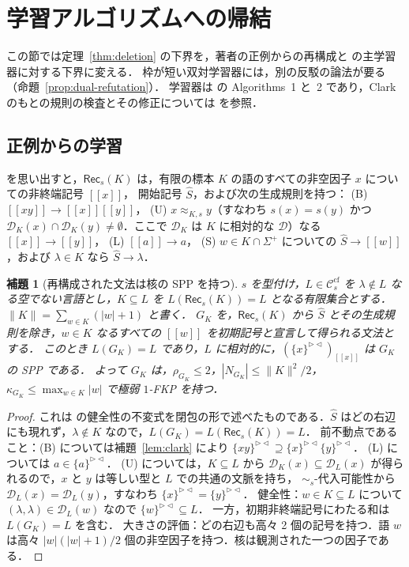 \documentclass[11pt,a4paper]{ltjsarticle}
\numberwithin{equation}{section}
\theoremstyle{plain}
\newtheorem{lemma}[theorem]{補題}
\theoremstyle{definition}
\theoremstyle{remark}
\theoremstyle{plain}
\newcommand{\eps}{\lambda}
\newcommand{\RL}{^{\rhd\lhd}}
\newcommand{\D}{\mathcal D}
\newcommand{\Ccf}[1]{\mathcal C^{\mathrm{cf}}_{#1}}
\begin{document}
\section{学習アルゴリズムへの帰結}\label{sec:applications}

この節では定理~\ref{thm:deletion} の下界を，著者の正例からの再構成と \citet{ky2017} の主学習器に対する下界に変える．
枠が短い双対学習器には，別の反駁の論法が要る（命題~\ref{prop:dual-refutation}）．
学習器は \citet{ky2017} の Algorithms~1 と~2 であり，Clark のもとの規則の検査とその修正については \citet{leiss2014} を参照．

\subsection*{正例からの学習}

\citet[Sec.~4.1]{kuriyama-tcs1} を思い出すと，$\mathsf{Rec}_s(K)$ は，有限の標本 $K$ の語のすべての非空因子 $x$ についての非終端記号 $[\![x]\!]$，
開始記号 $\widehat S$，および次の生成規則を持つ：
(B) $[\![xy]\!]\to[\![x]\!][\![y]\!]$，
(U) $x\approx_{K,s}y$（すなわち $s(x)=s(y)$ かつ $\D_K(x)\cap\D_K(y)\ne\emptyset$．ここで $\D_K$ は $K$ に相対的な $\D$）なる $[\![x]\!]\to[\![y]\!]$，
(L) $[\![a]\!]\to a$，
(S) $w\in K\cap\Sigma^+$ についての $\widehat S\to[\![w]\!]$，および $\eps\in K$ なら $\widehat S\to\eps$．

\begin{lemma}[再構成された文法は核の SPP を持つ]\label{lem:rec-kernel}
$s$ を型付け，$L\in\Ccf s$ を $\eps\notin L$ なる空でない言語とし，$K\subseteq L$ を $L(\mathsf{Rec}_s(K))=L$ となる有限集合とする．
$\|K\|=\sum_{w\in K}(|w|+1)$ と書く．
$G_K$ を，$\mathsf{Rec}_s(K)$ から $\widehat S$ とその生成規則を除き，$w\in K$ なるすべての $[\![w]\!]$ を初期記号と宣言して得られる文法とする．
このとき $L(G_K)=L$ であり，$L$ に相対的に，$(\{x\}\RL)_{[\![x]\!]}$ は $G_K$ の SPP である．
よって $G_K$ は，$\rho_{G_K}\le2$，$|N_{G_K}|\le\|K\|^2/2$，$\kappa_{G_K}\le\max_{w\in K}|w|$ で極弱 $1$-FKP を持つ．
\end{lemma}
\begin{proof}
これは \citet[Thm.~4.2]{kuriyama-tcs1} の健全性の不変式を閉包の形で述べたものである．$\widehat S$ はどの右辺にも現れず，$\eps\notin K$ なので，$L(G_K)=L(\mathsf{Rec}_s(K))=L$．
前不動点であること：(B) については補題~\ref{lem:clark} により $\{xy\}\RL\supseteq\{x\}\RL\{y\}\RL$．
(L) については $a\in\{a\}\RL$．
(U) については，$K\subseteq L$ から $\D_K(x)\subseteq\D_L(x)$ が得られるので，$x$ と $y$ は等しい型と $L$ での共通の文脈を持ち，
$\sim_s$-代入可能性から $\D_L(x)=\D_L(y)$，すなわち $\{x\}\RL=\{y\}\RL$．
健全性：$w\in K\subseteq L$ について $(\eps,\eps)\in\D_L(w)$ なので $\{w\}\RL\subseteq L$．
一方，初期非終端記号にわたる和は $L(G_K)=L$ を含む．
大きさの評価：どの右辺も高々 2 個の記号を持つ．語 $w$ は高々 $|w|(|w|+1)/2$ 個の非空因子を持つ．核は観測された一つの因子である．
\end{proof}
\end{document}
